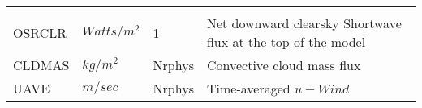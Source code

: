 \begin{tabular}{llll}
\begin{minipage}[t]{3in}
     \end{minipage}\\
 OSRCLR   &   $Watts/m^2$  &    1  
     &\begin{minipage}[t]{3in}
      {Net downward clearsky Shortwave flux at the top of the model}
     \end{minipage}\\
 CLDMAS   &   $kg / m^2$  &    Nrphys
     &\begin{minipage}[t]{3in}
      {Convective cloud mass flux}
     \end{minipage}\\
 UAVE     &   $m/sec$  &    Nrphys
     &\begin{minipage}[t]{3in}
      {Time-averaged $u-Wind$}
     \end{minipage}\\
\end{tabular}
\vfill

